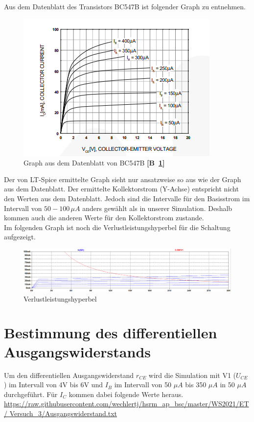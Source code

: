         Aus dem Datenblatt des Transistors BC547B ist folgender Graph zu entnehmen.

        \begin{figure}[!ht]
            \centering
            \includegraphics[]{Bilder/25datenblatt.PNG}
            \caption{Graph aus dem Datenblatt von BC547B \textbf{[B~\ref{fig:252}]}}
            \label{fig:252}
        \end{figure}

        Der von LT-Spice ermittelte Graph sieht nur ansatzweise so aus wie der Graph aus dem Datenblatt. Der ermittelte Kollektorstrom (Y-Achse) entspricht nicht den Werten aus dem Datenblatt. Jedoch sind die Intervalle für den Basisstrom im Intervall von \(50-100\,\mu A\) anders gewählt als in unserer Simulation. Deshalb kommen auch die anderen Werte für den Kollektorstrom zustande.\\
        Im folgenden Graph ist noch die Verlustleistungshyperbel für die Schaltung aufgezeigt.

        
        \begin{figure}[!ht]
            \centering
            \includegraphics[width=\linewidth]{Bilder/25Verlustl.PNG}
            \caption{Verlustleistungshyperbel}
        \end{figure}

    \section{Bestimmung des differentiellen Ausgangswiderstands}
        Um den differentiellen Ausgangswiderstand \(r_{CE}\) wird die Simulation mit V1 (\(U_{CE}\)) im Intervall von 4V bis 6V und \(I_B\) im Intervall von 50 \(\mu A\) bis 350 \(\mu A\) in 50 \(\mu A\) durchgeführt. Für \(I_C\) kommen dabei folgende Werte heraus.\\
        \url{https://raw.githubusercontent.com/wechlertj/hsrm_ap_bsc/master/WS2021/ET/ Versuch_3/Ausgangswiderstand.txt}\\

